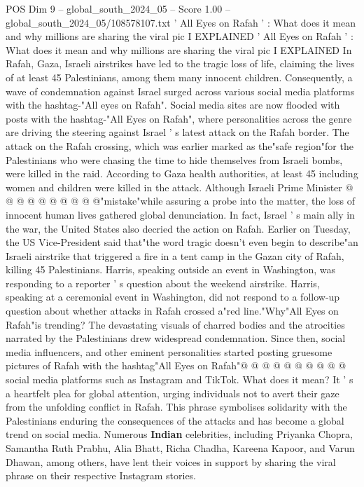 \begin{textsample}{POS Dim 9 – global\_south\_2024\_05 – Score 1.00 – global\_south\_2024\_05/108578107.txt}  \label{ex:f9_pos_040}
' All Eyes on Rafah ' : What does it mean and why millions are sharing the viral pic I EXPLAINED ' All Eyes on Rafah ' : What does it mean and why millions are sharing the viral pic I EXPLAINED In Rafah, Gaza, Israeli airstrikes have led to the tragic loss of life, claiming the lives of at least 45 Palestinians, among them many innocent children.
Consequently, a wave of condemnation against Israel surged across various social media platforms with the hashtag-"All eyes on Rafah".
Social media sites are now flooded with posts with the hashtag-"All Eyes on Rafah", where personalities across the genre are driving the steering against Israel ' s latest attack on the Rafah border.
The attack on the Rafah crossing, which was earlier marked as the"safe region"for the Palestinians who were chasing the time to hide themselves from Israeli bombs, were killed in the raid.
According to Gaza health authorities, at least 45 including women and children were killed in the attack.
Although Israeli Prime Minister @ @ @ @ @ @ @ @ @ @"mistake"while assuring a probe into the matter, the loss of innocent human lives gathered global denunciation.
In fact, Israel ' s main ally in the war, the United States also decried the action on Rafah.
Earlier on Tuesday, the US Vice-President said that"the word tragic doesn't even begin to describe"an Israeli airstrike that triggered a fire in a tent camp in the Gazan city of Rafah, killing 45 Palestinians.
Harris, speaking outside an event in Washington, was responding to a reporter ' s question about the weekend airstrike.
Harris, speaking at a ceremonial event in Washington, did not respond to a follow-up question about whether attacks in Rafah crossed a"red line."Why"All Eyes on Rafah"is trending?
The devastating visuals of charred bodies and the atrocities narrated by the Palestinians drew widespread condemnation.
Since then, social media influencers, and other eminent personalities started posting gruesome pictures of Rafah with the hashtag"All Eyes on Rafah"@ @ @ @ @ @ @ @ @ @ social media platforms such as Instagram and TikTok.
What does it mean?
It ' s a heartfelt plea for global attention, urging individuals not to avert their gaze from the unfolding conflict in Rafah.
This phrase symbolises solidarity with the Palestinians enduring the consequences of the attacks and has become a global trend on social media.
Numerous \textbf{Indian} celebrities, including Priyanka Chopra, Samantha Ruth Prabhu, Alia Bhatt, Richa Chadha, Kareena Kapoor, and Varun Dhawan, among others, have lent their voices in support by sharing the viral phrase on their respective Instagram stories.

\end{textsample}
